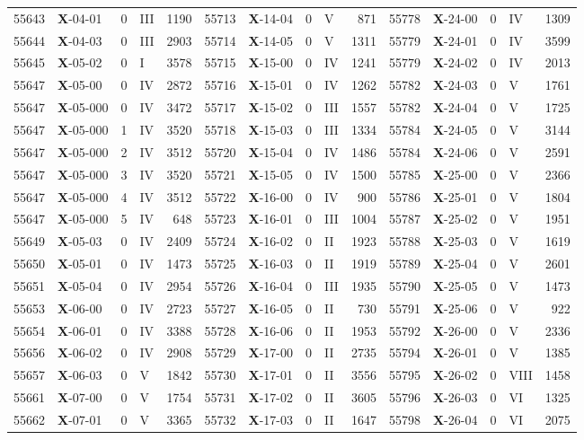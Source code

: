 \begin{table*}
\begin{tabular}{llllrllllrllllr}
55643&\textbf{X}-04-01&0&III&1190&55713&\textbf{X}-14-04&0&V&871&55778&\textbf{X}-24-00&0&IV&1309\\
55644&\textbf{X}-04-03&0&III&2903&55714&\textbf{X}-14-05&0&V&1311&55779&\textbf{X}-24-01&0&IV&3599\\
55645&\textbf{X}-05-02&0&I&3578&55715&\textbf{X}-15-00&0&IV&1241&55779&\textbf{X}-24-02&0&IV&2013\\
55647&\textbf{X}-05-00&0&IV&2872&55716&\textbf{X}-15-01&0&IV&1262&55782&\textbf{X}-24-03&0&V&1761\\
55647&\textbf{X}-05-000&0&IV&3472&55717&\textbf{X}-15-02&0&III&1557&55782&\textbf{X}-24-04&0&V&1725\\
55647&\textbf{X}-05-000&1&IV&3520&55718&\textbf{X}-15-03&0&III&1334&55784&\textbf{X}-24-05&0&V&3144\\
55647&\textbf{X}-05-000&2&IV&3512&55720&\textbf{X}-15-04&0&IV&1486&55784&\textbf{X}-24-06&0&V&2591\\
55647&\textbf{X}-05-000&3&IV&3520&55721&\textbf{X}-15-05&0&IV&1500&55785&\textbf{X}-25-00&0&V&2366\\
55647&\textbf{X}-05-000&4&IV&3512&55722&\textbf{X}-16-00&0&IV&900&55786&\textbf{X}-25-01&0&V&1804\\
55647&\textbf{X}-05-000&5&IV&648&55723&\textbf{X}-16-01&0&III&1004&55787&\textbf{X}-25-02&0&V&1951\\
55649&\textbf{X}-05-03&0&IV&2409&55724&\textbf{X}-16-02&0&II&1923&55788&\textbf{X}-25-03&0&V&1619\\
55650&\textbf{X}-05-01&0&IV&1473&55725&\textbf{X}-16-03&0&II&1919&55789&\textbf{X}-25-04&0&V&2601\\
55651&\textbf{X}-05-04&0&IV&2954&55726&\textbf{X}-16-04&0&III&1935&55790&\textbf{X}-25-05&0&V&1473\\
55653&\textbf{X}-06-00&0&IV&2723&55727&\textbf{X}-16-05&0&II&730&55791&\textbf{X}-25-06&0&V&922\\
55654&\textbf{X}-06-01&0&IV&3388&55728&\textbf{X}-16-06&0&II&1953&55792&\textbf{X}-26-00&0&V&2336\\
55656&\textbf{X}-06-02&0&IV&2908&55729&\textbf{X}-17-00&0&II&2735&55794&\textbf{X}-26-01&0&V&1385\\
55657&\textbf{X}-06-03&0&V&1842&55730&\textbf{X}-17-01&0&II&3556&55795&\textbf{X}-26-02&0&VIII&1458\\
55661&\textbf{X}-07-00&0&V&1754&55731&\textbf{X}-17-02&0&II&3605&55796&\textbf{X}-26-03&0&VI&1325\\
55662&\textbf{X}-07-01&0&V&3365&55732&\textbf{X}-17-03&0&II&1647&55798&\textbf{X}-26-04&0&VI&2075\\

\end{tabular}
\end{table*}

